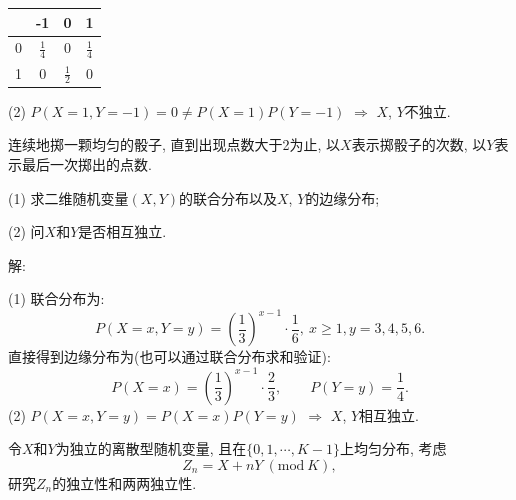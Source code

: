 \documentclass[standard]{ExBook}
\begin{document}
\begin{qitems}
\vspace{-5em}

    \begin{bbox}
\begin{center}
    \renewcommand{\arraystretch}{1.4}
    \setlength{\tabcolsep}{12pt}
    \begin{tabular}{c|c|c|c}
	    \hline
	    \diagbox{$X$}{$P(X,Y)$}{$Y$} & -1 & 0 & 1\\
	    \hline
	    0 & $\displaystyle\frac{1}{4}$ & 0 & $\displaystyle\frac{1}{4}$\\
	    \hline
	    1 & 0 & $\displaystyle\frac{1}{2}$ & 0\\
	    \hline
    \end{tabular}
\end{center}
(2) $P(X=1,Y=-1)=0\neq P(X=1)P(Y=-1)$ $\Longrightarrow$ $X$, $Y$不独立.
    \end{bbox}

\vspace{-5em}

    \begin{bbox}
    \begin{shaded}
        \qitem
连续地掷一颗均匀的骰子, 直到出现点数大于2为止, 以$X$表示掷骰子的次数, 以$Y$表示最后一次掷出的点数.

(1) 求二维随机变量$(X,Y)$的联合分布以及$X$, $Y$的边缘分布;

(2) 问$X$和$Y$是否相互独立.
    \end{shaded}
    \end{bbox}

\vspace{-5em}

    \begin{bbox}
解: 

(1) 联合分布为:
$$P(X=x,Y=y)=\left(\frac{1}{3}\right)^{x-1}\cdot\frac{1}{6},\ x\geq1,y=3,4,5,6.$$
直接得到边缘分布为(也可以通过联合分布求和验证):
$$P(X=x)=\left(\frac{1}{3}\right)^{x-1}\cdot\frac{2}{3},\qquad P(Y=y)=\frac{1}{4}.$$
(2) $P(X=x,Y=y)=P(X=x)P(Y=y)$ $\Longrightarrow$ $X$, $Y$相互独立.
    \end{bbox}

\vspace{-5em}

    \begin{bbox}
    \begin{shaded}
        \qitem
令$X$和$Y$为独立的离散型随机变量, 且在$\{0,1,\cdots,K-1\}$上均匀分布, 考虑
$$Z_n=X+nY\ (\text{mod}\ K),$$
研究$Z_n$的独立性和两两独立性.
    \end{shaded}
    \end{bbox}


\end{qitems}
\end{document}
